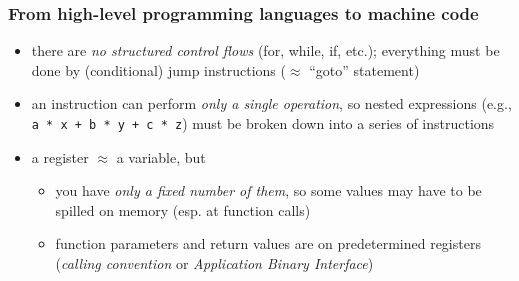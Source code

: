 \documentclass[12pt,dvipdfmx]{beamer}
\newif\ifen
\newif\ifja
\newcommand{\aka}[1]{{\color{red}#1}}
\begin{document}
\ifja
\section{コンパイルの基本}
\fi
\ifen
\section{Compilation Basics}
\fi

\begin{frame}
  \frametitle{From high-level programming languages to machine code}
  \begin{itemize}
  \item there are \aka{\it no structured control flows} (for, while, if, etc.);
    everything must be done by (conditional) jump instructions
    ($\approx$ ``goto'' statement)
  \item an instruction can perform \aka{\it only a single operation}, so
    nested expressions (e.g., {\tt a * x + b * y + c * z}) must be
    broken down into a series of instructions
  \item a register $\approx$ a variable, but
    \begin{itemize}
    \item you have \aka{\it only a fixed number of them},
      so some values may have to be spilled on memory (esp. at function calls)
    \item function parameters and return values are on
      predetermined registers ({\it calling convention}
      or {\it Application Binary Interface})
    \end{itemize}
  \end{itemize}
\end{frame}

\ifja
\begin{frame}[fragile]
  \frametitle{コード生成 --- 人間コンパイラ内観}
  \begin{itemize}
  \item 例: 以下(ちなみに$\sqrt{c}$を求めるニュートン法)をどう機械語にするか
\begin{lstlisting}
double sq(double c, long n) {
  double x = c;
  for (long i = 0; i < n; i++) {
    x = x / 2 + c / (x + x);
  }
  return x;
}
\end{lstlisting}
\end{itemize}
\end{frame}
\fi

\ifen
\begin{frame}[fragile]
  \frametitle{Code generation by hand --- introspecting ``human compiler''}
  \begin{itemize}
  \item ex: how to convert the following (which finds $\sqrt{c}$ by the Newton method)
    into machine language 
\begin{lstlisting}
double sq(double c, long n) {
  double x = c;
  for (long i = 0; i < n; i++) {
    x = x / 2 + c / (x + x);
  }
  return x;
}
\end{lstlisting}
\end{itemize}
\end{frame}
\fi
\end{document}
